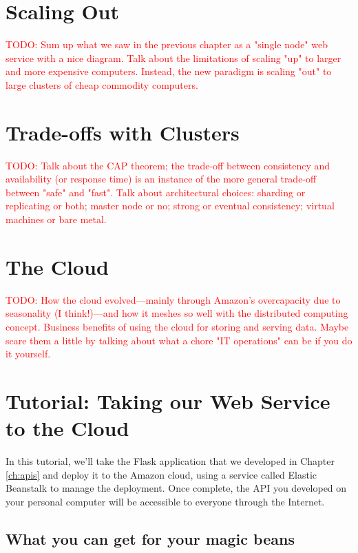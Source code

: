\documentclass[11pt]{book}
\newcommand{\todo}[1]{\textcolor{red}{TODO: #1}} %
\begin{document}
\section{Scaling Out}
\todo{Sum up what we saw in the previous chapter as a "single node" web service with a nice diagram.  Talk about the limitations of scaling "up" to larger and more expensive computers.  Instead, the new paradigm is scaling "out" to large clusters of cheap commodity computers.}

\section{Trade-offs with Clusters}
\todo{Talk about the CAP theorem; the trade-off between consistency and availability (or response time) is an instance of the more general trade-off between "safe" and "fast".  Talk about architectural choices: sharding or replicating or both; master node or no; strong or eventual consistency; virtual machines or bare metal.}

\section{The Cloud}
\todo{How the cloud evolved---mainly through Amazon's overcapacity due to seasonality (I think!)---and how it meshes so well with the distributed computing concept.  Business benefits of using the cloud for storing and serving data.  Maybe scare them a little by talking about what a chore "IT operations" can be if you do it yourself.}



\section{Tutorial: Taking our Web Service to the Cloud}

In this tutorial, we'll take the Flask application that we developed in Chapter \ref{ch:apis} and deploy it to the Amazon cloud, using a service called Elastic Beanstalk to manage the deployment.  Once complete, the API you developed on your personal computer will be accessible to everyone through the Internet.

\subsection*{What you can get for your magic beans}
\end{document}
